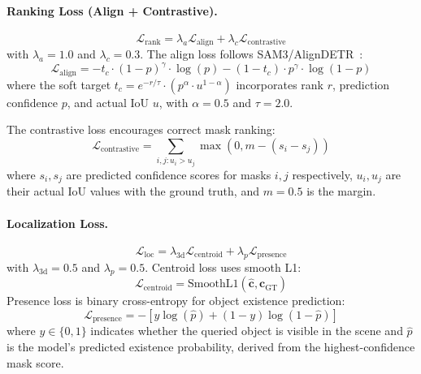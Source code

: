 \paragraph{Ranking Loss (Align + Contrastive).}
\begin{equation}
\mathcal{L}_{\text{rank}} = \lambda_a \mathcal{L}_{\text{align}} + \lambda_c \mathcal{L}_{\text{contrastive}}
\end{equation}
with $\lambda_a = 1.0$ and $\lambda_c = 0.3$. The align loss follows SAM3/AlignDETR~\cite{align2024}:
\begin{equation}
\mathcal{L}_{\text{align}} = -t_c \cdot (1-p)^\gamma \cdot \log(p) - (1-t_c) \cdot p^\gamma \cdot \log(1-p)
\end{equation}
where the soft target $t_c = e^{-r/\tau} \cdot (p^\alpha \cdot u^{1-\alpha})$ incorporates rank $r$, prediction confidence $p$, and actual IoU $u$, with $\alpha=0.5$ and $\tau=2.0$.

The contrastive loss encourages correct mask ranking:
\begin{equation}
\mathcal{L}_{\text{contrastive}} = \sum_{i,j: u_i > u_j} \max(0, m - (s_i - s_j))
\end{equation}
where $s_i, s_j$ are predicted confidence scores for masks $i, j$ respectively, $u_i, u_j$ are their actual IoU values with the ground truth, and $m=0.5$ is the margin.

\paragraph{Localization Loss.}
\begin{equation}
\mathcal{L}_{\text{loc}} = \lambda_{\text{3d}} \mathcal{L}_{\text{centroid}} + \lambda_p \mathcal{L}_{\text{presence}}
\end{equation}
with $\lambda_{\text{3d}} = 0.5$ and $\lambda_p = 0.5$. Centroid loss uses smooth L1:
\begin{equation}
\mathcal{L}_{\text{centroid}} = \text{SmoothL1}(\hat{\mathbf{c}}, \mathbf{c}_{\text{GT}})
\end{equation}
Presence loss is binary cross-entropy for object existence prediction:
\begin{equation}
\mathcal{L}_{\text{presence}} = -\left[ y \log(\hat{p}) + (1 - y) \log(1 - \hat{p}) \right]
\end{equation}
where $y \in \{0, 1\}$ indicates whether the queried object is visible in the scene and $\hat{p}$ is the model's predicted existence probability, derived from the highest-confidence mask score.

